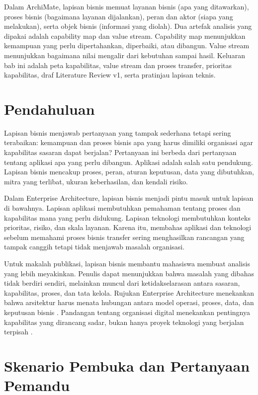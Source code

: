 Dalam ArchiMate, lapisan bisnis memuat layanan bisnis (apa yang ditawarkan),
proses bisnis (bagaimana layanan dijalankan), peran dan aktor (siapa yang
melakukan), serta objek bisnis (informasi yang diolah). Dua artefak analisis
yang dipakai adalah capability map dan value stream. Capability map menunjukkan
kemampuan yang perlu dipertahankan, diperbaiki, atau dibangun. Value stream
menunjukkan bagaimana nilai mengalir dari kebutuhan sampai hasil. Keluaran bab
ini adalah peta kapabilitas, value stream dan proses transfer, prioritas
kapabilitas, draf Literature Review v1, serta pratinjau lapisan teknis.

\section{Pendahuluan}

Lapisan bisnis menjawab pertanyaan yang tampak sederhana tetapi sering
terabaikan: kemampuan dan proses bisnis apa yang harus dimiliki organisasi agar
kapabilitas sasaran dapat berjalan? Pertanyaan ini berbeda dari pertanyaan
tentang aplikasi apa yang perlu dibangun. Aplikasi adalah salah satu pendukung.
Lapisan bisnis mencakup proses, peran, aturan keputusan, data yang dibutuhkan,
mitra yang terlibat, ukuran keberhasilan, dan kendali risiko.

Dalam Enterprise Architecture, lapisan bisnis menjadi pintu masuk untuk lapisan
di bawahnya. Lapisan aplikasi membutuhkan pemahaman tentang proses dan
kapabilitas mana yang perlu didukung. Lapisan teknologi membutuhkan konteks
prioritas, risiko, dan skala layanan. Karena itu, membahas aplikasi dan
teknologi sebelum memahami proses bisnis transfer sering menghasilkan rancangan
yang tampak canggih tetapi tidak menjawab masalah organisasi.

Untuk makalah publikasi, lapisan bisnis membantu mahasiswa membuat analisis yang
lebih meyakinkan. Penulis dapat menunjukkan bahwa masalah yang dibahas tidak
berdiri sendiri, melainkan muncul dari ketidakselarasan antara sasaran,
kapabilitas, proses, dan tata kelola. Rujukan Enterprise Architecture menekankan
bahwa arsitektur harus menata hubungan antara model operasi, proses, data, dan
keputusan bisnis \cite{ross2006enterprise}. Pandangan tentang organisasi digital
menekankan pentingnya kapabilitas yang dirancang sadar, bukan hanya proyek
teknologi yang berjalan terpisah \cite{ross2019designed}.

\section{Skenario Pembuka dan Pertanyaan Pemandu}

